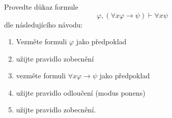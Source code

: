 \subsubsection{}
Provedte důkaz formule
$$\varphi ,(\forall x\varphi\rightarrow \psi )\vdash \forall x \psi$$
dle následujícího návodu:

\begin{enumerate}
  \item Vezměte formuli $\varphi$ jako předpoklad
  \item užijte pravidlo zobecnění
  \item vezměte formuli $\forall x \varphi \rightarrow \psi $ jako předpoklad
  \item užijte pravidlo odloučení (modus ponens)
  \item užijte pravidlo zobecnění.
\end{enumerate}
